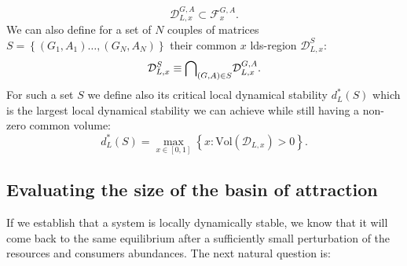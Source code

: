 \documentclass[12pt, titlepage]{report}
\begin{document}
\begin{equation}
\mathcal{D}_{L,x}^{G,A} \subset \mathcal{F}_x^{G,A}.
\end{equation}
We can also define for a set of $N$ couples of matrices $S=\left\{(G_1, A_1) \dots, (G_N, A_N)\right\}$ their common $x$ lds-region $\mathcal{D}_{L,x}^S$:
\begin{equation}
\mathcal{D}_{L,x}^S \equiv {\bigcap}_{(G,A) \in S} \mathcal{D}_{L,x}^{G,A}.
\end{equation}
For such a set $S$ we define also its critical local dynamical stability $d_L^*(S)$ which is the largest local dynamical stability we can achieve while still having a non-zero common volume:
\begin{equation}
d_L^*(S) = \max_{x \in [0,1]}\left\{x: \text{Vol}(\mathcal{D}_{L,x}) > 0\right\}.
\end{equation}


\subsection{Evaluating the size of the basin of attraction}
If we establish that a system is locally dynamically stable, we know that it will come back to the same equilibrium after a sufficiently small perturbation of the resources and consumers abundances. The next natural question is:


\begin{centering}
\end{centering}
\end{document}
